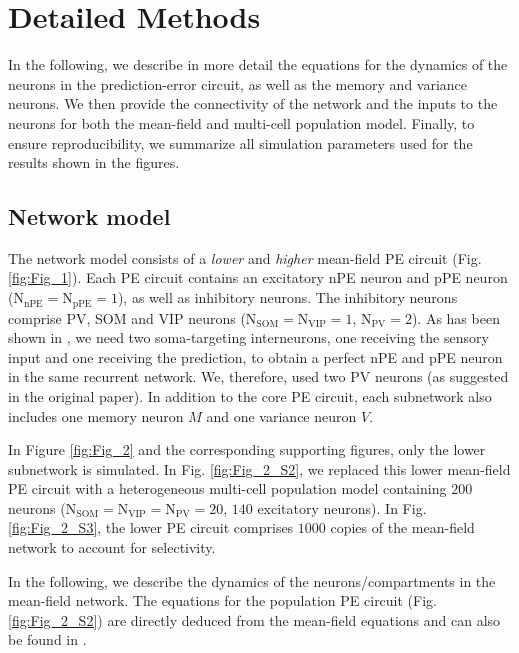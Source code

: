 \documentclass[10pt,a4paper]{article}
\begin{document}
\clearpage
\appendix
\tableofcontents

\setcounter{figure}{-1}
\renewcommand{\thefigure}{S\arabic{figure}}

\section{Detailed Methods}
%
In the following, we describe in more detail the equations for the dynamics of the neurons in the prediction-error circuit, as well as the memory and variance neurons. We then provide the connectivity of the network and the inputs to the neurons for both the mean-field and multi-cell population model. Finally, to ensure reproducibility, we summarize all simulation parameters used for the results shown in the figures.  

\subsection{Network model}
%
The network model consists of a \textit{lower} and \textit{higher} mean-field PE circuit (Fig. \ref{fig:Fig_1}). Each PE circuit contains an excitatory nPE neuron and pPE neuron ($\mathrm{N}_\mathrm{nPE} = \mathrm{N}_\mathrm{pPE} = 1$), as well as inhibitory neurons. The inhibitory neurons comprise PV, SOM and VIP neurons ($\mathrm{N}_\mathrm{SOM} = \mathrm{N}_\mathrm{VIP} = 1$, $\mathrm{N}_\mathrm{PV} = 2$). As has been shown in \cite{hertag2022prediction}, we need two soma-targeting interneurons, one receiving the sensory input and one receiving the prediction, to obtain a perfect nPE and pPE neuron in the same recurrent network. We, therefore, used two PV neurons (as suggested in the original paper). In addition to the core PE circuit, each subnetwork also includes one memory neuron $M$ and one variance neuron $V$. 

In Figure \ref{fig:Fig_2} and the corresponding supporting figures, only the lower subnetwork is simulated. In Fig. \ref{fig:Fig_2_S2}, we replaced this lower mean-field PE circuit with a heterogeneous multi-cell population model containing $200$ neurons ($\mathrm{N}_\mathrm{SOM} = \mathrm{N}_\mathrm{VIP} = \mathrm{N}_\mathrm{PV} = 20$, $140$ excitatory neurons). In Fig. \ref{fig:Fig_2_S3}, the lower PE circuit comprises $1000$ copies of the mean-field network to account for selectivity.

In the following, we describe the dynamics of the neurons/compartments in the mean-field network. The equations for the population PE circuit (Fig. \ref{fig:Fig_2_S2}) are directly deduced from the mean-field equations and can also be found in \citep{hertag2022prediction}.
\end{document}
